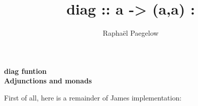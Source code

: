 \documentclass[a4paper,12pt]{article}
\author{Raphaël Paegelow}
\title{diag :: a -> (a,a) : }
\begin{document}
\theoremstyle{definition}
\newtheorem{deff}{Définition}
\newtheorem{nota}{Notation}

\theoremstyle{remark}
\newtheorem{rmq}{Remarque}
\newtheorem{ex}{Exemple}

\theoremstyle{plain}

\newtheorem{thm}{Théorème}
\newtheorem{prop}{Proposition}
\newtheorem*{lemme}{Lemme}
\newtheorem{fait}{Fait}
\newtheorem*{conj}{Conjecture}


\maketitle
\begin{center}
\textbf{diag funtion\\
	Adjunctions and monads
}
\end{center}

First of all, here is a remainder of James implementation:
\end{document}
